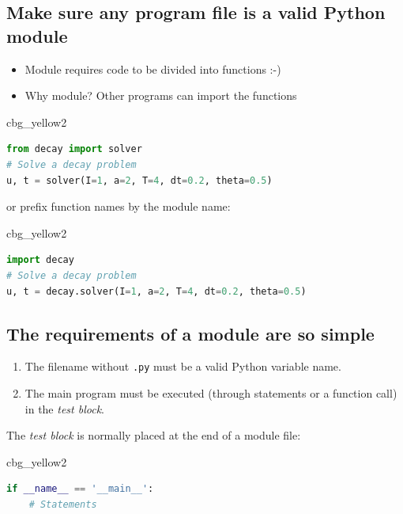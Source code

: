 \documentclass[%
oneside,                 %
final,                   %
10pt]{article}
\newenvironment{_cod_tight}[1]{
   \def\FrameCommand{\colorbox{#1}}
   \FrameRule0.6pt\MakeFramed {\FrameRestore}\vskip3mm}
   {\vskip0mm\endMakeFramed}
\newenvironment{cod}[1]{
\bgroup\rmfamily
\fboxsep=0mm\relax
\begin{_cod_tight}{#1}
\list{}{\parsep=-2mm\parskip=0mm\topsep=0pt\leftmargin=2mm
\rightmargin=2\leftmargin\leftmargin=4pt\relax}
\item\relax}
{\endlist\end{_cod_tight}\egroup}
\begin{document}
\subsection*{Make sure any program file is a valid Python module}

\begin{itemize}
 \item Module requires code to be divided into functions :-)

 \item Why module? Other programs can import the functions
\end{itemize}

\noindent
\begin{cod}{cbg_yellow2}\begin{lstlisting}[language=Python,style=simple,xleftmargin=2mm]
from decay import solver
# Solve a decay problem
u, t = solver(I=1, a=2, T=4, dt=0.2, theta=0.5)
\end{lstlisting}\end{cod}
\noindent
or prefix function names by the module name:

\begin{cod}{cbg_yellow2}\begin{lstlisting}[language=Python,style=simple,xleftmargin=2mm]
import decay
# Solve a decay problem
u, t = decay.solver(I=1, a=2, T=4, dt=0.2, theta=0.5)
\end{lstlisting}\end{cod}
\noindent

\subsection*{The requirements of a module are so simple}

\begin{enumerate}
\item The filename without \texttt{.py} must be a valid Python variable name.

\item The main program must be executed (through statements or
   a function call) in the \emph{test block}.
\end{enumerate}

\noindent
The \emph{test block} is normally placed at the end of a module file:

\begin{cod}{cbg_yellow2}\begin{lstlisting}[language=Python,style=simple,xleftmargin=2mm]
if __name__ == '__main__':
    # Statements
\end{lstlisting}\end{cod}
\noindent
\end{document}
